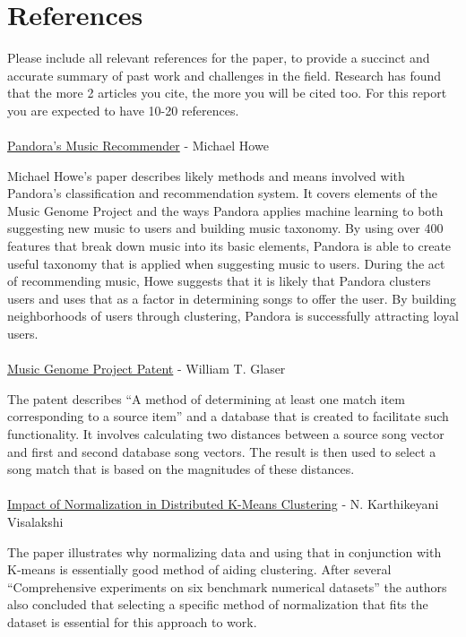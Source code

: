 \documentclass[12pt]{article}
\begin{document}
\section{References}
\label{sec:references}
 Please include all relevant references for the paper, to provide a succinct and accurate
 summary of past work and challenges in the field. Research has found that the more
 2
 articles you cite, the more you will be cited too. For this report you are expected to have 10-20
 references.
\\ \\
\href{http://courses.cs.washington.edu/courses/csep521/07wi/prj/michael.pdf}{Pandora's Music Recommender} - Michael Howe 

Michael Howe's paper describes likely methods and means involved with Pandora's classification and recommendation system. It covers elements of the Music Genome Project and the ways Pandora applies machine learning to both suggesting new music to users and building music taxonomy. By using over 400 features that break down music into its basic elements, Pandora is able to create useful taxonomy that is applied when suggesting music to users. During the act of recommending music, Howe suggests that it is likely that Pandora clusters users and uses that as a factor in determining songs to offer the user. By building neighborhoods of users through clustering, Pandora is successfully attracting loyal users.
\\ \\
\href{http://www.google.com/patents/US7003515?dq=7,003,515}{Music Genome Project Patent} - William T. Glaser 

The patent describes  ``A method of determining at least one match item corresponding to a source item'' and a database that is created to facilitate such functionality. It involves calculating two distances between a source song vector and  first and second database song vectors. The result is then used to select a song match that is based on the magnitudes of these distances.
\\ \\
\href{http://www.medwelljournals.com/fulltext/?doi=ijscomp.2009.168.172}{Impact of Normalization in Distributed K-Means Clustering} - N. Karthikeyani Visalakshi 

The paper illustrates why normalizing data and using that in conjunction with K-means is essentially good method of aiding clustering. After several ``Comprehensive experiments on six benchmark numerical datasets'' the authors also concluded that selecting a specific method of normalization that fits the dataset is essential for this approach to work.
\end{document}
